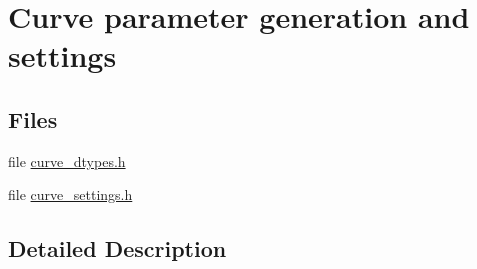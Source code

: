 \hypertarget{group__elips}{}\section{Curve parameter generation and settings}
\label{group__elips}
\subsection*{Files}
\begin{DoxyCompactItemize}
\item 
file \hyperlink{curve__dtypes_8h}{curve\+\_\+dtypes.\+h}
\item 
file \hyperlink{curve__settings_8h}{curve\+\_\+settings.\+h}
\end{DoxyCompactItemize}


\subsection{Detailed Description}
